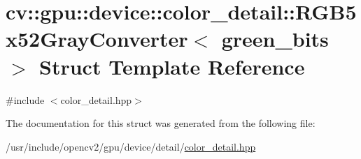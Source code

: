 \hypertarget{structcv_1_1gpu_1_1device_1_1color__detail_1_1RGB5x52GrayConverter}{\section{cv\-:\-:gpu\-:\-:device\-:\-:color\-\_\-detail\-:\-:R\-G\-B5x52\-Gray\-Converter$<$ green\-\_\-bits $>$ Struct Template Reference}
\label{structcv_1_1gpu_1_1device_1_1color__detail_1_1RGB5x52GrayConverter}
}


{\ttfamily \#include $<$color\-\_\-detail.\-hpp$>$}



The documentation for this struct was generated from the following file\-:\begin{DoxyCompactItemize}
\item 
/usr/include/opencv2/gpu/device/detail/\hyperlink{color__detail_8hpp}{color\-\_\-detail.\-hpp}\end{DoxyCompactItemize}

